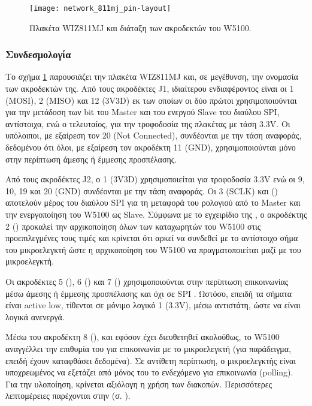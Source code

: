 \begin{figure}
    \caption{Πλακέτα WIZ811MJ και διάταξη των ακροδεκτών του W5100.
    \label{fig:net:811mj-pins}}
    \begin{center}
    \texttt{[image: network\_811mj\_pin-layout]}
    \end{center}
\end{figure}


\subsubsection{Συνδεσμολογία}

Το σχήμα \ref{fig:net:811mj-pins} παρουσιάζει την πλακέτα WIZ811MJ και, σε
μεγέθυνση, την ονομασία των ακροδεκτών της. Από τους ακροδέκτες J1, ιδιαίτερου
ενδιαφέροντος είναι οι 1 (MOSI), 2 (MISO) και 12 (3V3D) εκ των οποίων οι δύο
πρώτοι χρησιμοποιούνται για την μετάδοση των bit του \textenglish{Master} και
του ενεργού \textenglish{Slave} του διαύλου SPI, αντίστοιχα, ενώ ο τελευταίος,
για την τροφοδοσία της πλακέτας με τάση 3.3V. Οι υπόλοιποι, με εξαίρεση τον 20
(\textenglish{Not Connected}), συνδέονται με την τάση αναφοράς, δεδομένου ότι
όλοι, με εξαίρεση τον ακροδέκτη 11 (GND), χρησιμοποιούνται μόνο στην περίπτωση
άμεσης ή έμμεσης προσπέλασης.

Από τους ακροδέκτες J2, ο 1 (3V3D) χρησιμοποιείται για τροφοδοσία 3.3V ενώ οι
9, 10, 19 και 20 (GND) συνδέονται με την τάση αναφοράς. Οι 3 (SCLK) και
() αποτελούν μέρος του διαύλου SPI για τη μεταφορά του ρολογιού από
το \textenglish{Master} και την ενεργοποίηση του W5100 ως \textenglish{Slave}.
Σύμφωνα με το εγχειρίδιο της \textcite[8]{wiz13:811mj}, ο ακροδέκτης 2
() προκαλεί την αρχικοποίηση όλων των καταχωρητών του W5100 στις
προεπιλεγμένες τους τιμές και κρίνεται ότι αρκεί να συνδεθεί με το αντίστοιχο
σήμα του μικροελεγκτή ώστε η αρχικοποίηση του W5100 να πραγματοποιείται μαζί
με του μικροελεγκτή.

Οι ακροδέκτες 5 (), 6 () και 7 () χρησιμοποιούνται
στην περίπτωση επικοινωνίας μέσω άμεσης ή έμμεσης προσπέλασης και όχι σε SPI
\parencite[8]{wiz11:w5100}. Ωστόσο, επειδή τα σήματα είναι
\textenglish{active low}, τίθενται σε μόνιμο λογικό 1 (3.3V), μέσω αντιστάτη,
ώστε να είναι λογικά ανενεργά.

Μέσω του ακροδέκτη 8 (), και εφόσον έχει διευθετηθεί ακολούθως, το
W5100 αναγγέλλει την επιθυμία του για επικοινωνία με το μικροελεγκτή (για
παράδειγμα, επειδή έχουν καταφθάσει δεδομένα). Σε αντίθετη περίπτωση, ο
μικροελεγκτής είναι υποχρεωμένος να εξετάζει από μόνος του το ενδεχόμενο για
επικοινωνία (\textenglish{polling}). Για την υλοποίηση, κρίνεται αξιόλογη η
χρήση των διακοπών. Περισσότερες λεπτομέρειες παρέχονται στην
 (σ. \pageref{ssubsec:network:ir_imr}).

